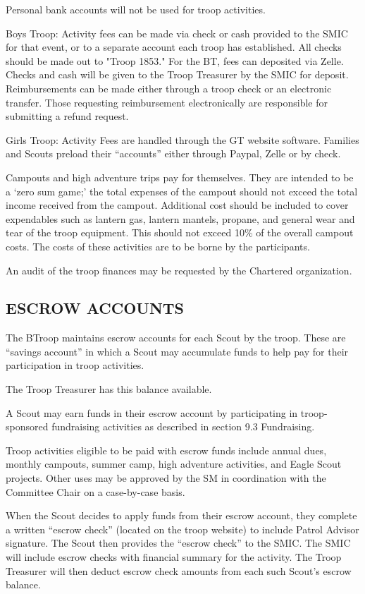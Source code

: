 \documentclass{ltxguide}
\begin{document}
Personal bank accounts will not be used for troop activities.

Boys Troop: Activity fees can be made via check or cash provided to the SMIC for that event, or to a separate account each troop has established. All checks should be made out to "Troop 1853." For the BT, fees can deposited via Zelle.  Checks and cash will be given to the Troop Treasurer by the SMIC for deposit. Reimbursements can be made either through a troop check or an electronic transfer. Those requesting reimbursement electronically are responsible for submitting a refund request.

Girls Troop: Activity Fees are handled through the GT website software. Families and Scouts preload their “accounts” either through Paypal, Zelle or by check. 

Campouts and high adventure trips pay for themselves. They are intended to be a ‘zero sum game;' the total expenses of the campout should not exceed the total income received from the campout. Additional cost should be included to cover expendables such as lantern gas, lantern mantels, propane, and general wear and tear of the troop equipment. This should not exceed 10\% of the overall campout costs. The costs of these activities are to be borne by the participants.

An audit of the troop finances may be requested by the Chartered organization.

\subsection{ESCROW ACCOUNTS}
The BTroop maintains escrow accounts for each Scout by the troop. These are “savings account” in which a Scout may accumulate funds to help pay for their participation in troop activities.

The Troop Treasurer has this balance available.

A Scout may earn funds in their escrow account by participating in troop-sponsored fundraising activities as described in section 9.3 Fundraising.

Troop activities eligible to be paid with escrow funds include annual dues, monthly campouts, summer camp, high adventure activities, and Eagle Scout projects. Other uses may be approved by the \ac{SM} in coordination with the Committee Chair on a case-by-case basis.

When the Scout decides to apply funds from their escrow account, they complete a written “escrow check” (located on the troop website) to include Patrol Advisor signature. The Scout then provides the “escrow check” to the SMIC. The SMIC will include escrow checks with financial summary for the activity. The Troop Treasurer will then deduct escrow check amounts from each such Scout's escrow balance.
\end{document}
